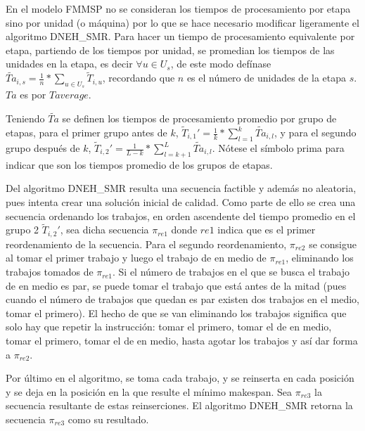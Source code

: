 \documentclass{article}
\begin{document}
\vspace{\baselineskip}
En el modelo FMMSP no se consideran los tiempos de procesamiento por etapa sino por unidad (o máquina) por lo que se hace necesario modificar ligeramente el algoritmo DNEH\_SMR. Para hacer un tiempo de procesamiento equivalente por etapa, partiendo de los tiempos por unidad, se promedian los tiempos de las unidades en la etapa, es decir $\forall u \in U_{s}$, de este modo defínase $\widetilde{Ta}_{i,s} = \frac{1}{n} *\sum_{u \in U_{s}} \widetilde{T}_{i,u}$, recordando que $n$ es el número de unidades de la etapa $s$. $Ta$ es por $T average$. 

\vspace{\baselineskip}
Teniendo $\widetilde{Ta}$ se definen los tiempos de procesamiento promedio por
grupo de etapas, para el primer grupo antes de $k$, $\widetilde{T}_{i,1}' = \frac{1}{k}*\sum_{l=1}^{k} \widetilde{Ta}_{i,l}$, y para el segundo grupo después de $k$, $\widetilde{T}_{i,2}' = \frac{1}{L-k}*\sum_{l = k+1}^{L} \widetilde{Ta}_{i,l}$. Nótese el símbolo prima para indicar que son los tiempos promedio de los grupos de etapas. \autocite{algMNIG}

\vspace{\baselineskip}
Del algoritmo DNEH\_SMR resulta una secuencia factible y además no aleatoria, pues intenta crear una solución inicial de calidad. Como parte de ello se crea una secuencia ordenando los trabajos, en orden ascendente del tiempo promedio en el grupo 2 $\widetilde{T}_{i,2}'$, sea dicha secuencia $\pi_{re1}$ donde $re1$ indica que es el primer reordenamiento de la secuencia. Para el segundo reordenamiento, $\pi_{re2}$ se consigue al tomar el primer trabajo y luego el trabajo de en medio de $\pi_{re1}$, eliminando los trabajos tomados de $\pi_{re1}$. Si el número de trabajos en el que se busca el trabajo de en medio es par, se puede tomar el trabajo que está antes de la mitad (pues cuando el número de trabajos que quedan es par existen dos trabajos en el medio, tomar el primero). El hecho de que se van eliminando los trabajos significa que solo hay que repetir la instrucción: tomar el primero, tomar el de en medio, tomar el primero, tomar el de en medio, hasta agotar los trabajos y así dar forma a $\pi_{re2}$. \autocite{algMNIG}

\vspace{\baselineskip}
Por último en el algoritmo, se toma cada trabajo, y se reinserta en cada posición y se deja en la posición en la que resulte el mínimo makespan. Sea $\pi_{re3}$ la secuencia resultante de estas reinserciones. El algoritmo DNEH\_SMR retorna la secuencia $\pi_{re3}$ como su resultado. \autocite{algMNIG}
\end{document}
